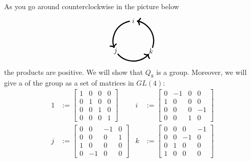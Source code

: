 \documentclass{ximera}
\begin{document}
As you go around counterclockwise in the picture below
\[
\begin{tikzpicture}
  \draw[ultra thick,->] (.94,-.34) arc (-20:80:1cm);
  \draw[ultra thick,->] (-.17,.98) arc (100:200:1cm);
  \draw[ultra thick,->] (-.77,-.64) arc (220:320:1cm);
  \node at (0,1) {$i$};
  \node at (-.87,-.5) {$j$};
  \node at (.87,-.5) {$k$};
\end{tikzpicture}
\]
the products are positive. We will show that $Q_8$ is a
group. Moreover, we will give a  of the group as a
set of matrices in $GL(4)$:
  \begin{align*}
    1 &:=
    \begin{bmatrix}
      1 & 0 & 0 & 0 \\
      0 & 1 & 0 & 0 \\
      0 & 0 & 1 & 0 \\
      0 & 0 & 0 & 1
    \end{bmatrix}
    &
    i &:=
    \begin{bmatrix}
      0 & -1 & 0 &  0 \\
      1 &  0 & 0 &  0 \\
      0 &  0 & 0 & -1 \\
      0 &  0 & 1 &  0
    \end{bmatrix} \\
    j &:=
    \begin{bmatrix}
      0 &  0 & -1 &  0 \\
      0 &  0 &  0 &  1 \\
      1 &  0 &  0 &  0 \\
      0 & -1 &  0 &  0 
    \end{bmatrix}
    &
    k &:=
    \begin{bmatrix}
      0 &  0 &  0 & -1 \\
      0 &  0 & -1 &  0 \\
      0 &  1 &  0 &  0 \\
      1 &  0 &  0 &  0 
    \end{bmatrix}
  \end{align*}
\end{document}
